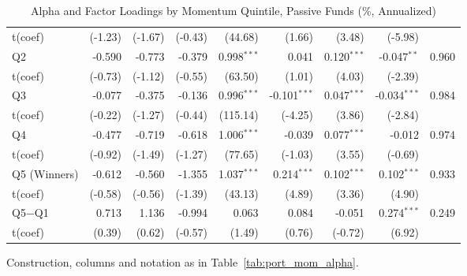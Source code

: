 \begin{table}[!htbp]
{\begin{tabular*}{\linewidth}{@{\extracolsep{\fill}}lrrrrrrrr}
\hspace{1em}t(coef) & (-1.23) & (-1.67) & (-0.43) & (44.68) & (1.66) & (3.48) & (-5.98) & \\
\hspace{1em}Q2 & -0.590 & -0.773 & -0.379 & 0.998$^{***}$ & 0.041 & 0.120$^{***}$ & -0.047$^{**}$ & 0.960\\
\hspace{1em}t(coef) & (-0.73) & (-1.12) & (-0.55) & (63.50) & (1.01) & (4.03) & (-2.39) & \\
\hspace{1em}Q3 & -0.077 & -0.375 & -0.136 & 0.996$^{***}$ & -0.101$^{***}$ & 0.047$^{***}$ & -0.034$^{***}$ & 0.984\\
\hspace{1em}t(coef) & (-0.22) & (-1.27) & (-0.44) & (115.14) & (-4.25) & (3.86) & (-2.84) & \\
\hspace{1em}Q4 & -0.477 & -0.719 & -0.618 & 1.006$^{***}$ & -0.039 & 0.077$^{***}$ & -0.012 & 0.974\\
\hspace{1em}t(coef) & (-0.92) & (-1.49) & (-1.27) & (77.65) & (-1.03) & (3.55) & (-0.69) & \\
\hspace{1em}Q5 (Winners) & -0.612 & -0.560 & -1.355 & 1.037$^{***}$ & 0.214$^{***}$ & 0.102$^{***}$ & 0.102$^{***}$ & 0.933\\
\hspace{1em}t(coef) & (-0.58) & (-0.56) & (-1.39) & (43.13) & (4.89) & (3.36) & (4.90) & \\
\hspace{1em}Q5$-$Q1 & 0.713 & 1.136 & -0.994 & 0.063 & 0.084 & -0.051 & 0.274$^{***}$ & 0.249\\
\hspace{1em}t(coef) & (0.39) & (0.62) & (-0.57) & (1.49) & (0.76) & (-0.72) & (6.92) & \\
\bottomrule
\end{tabular*}%
}\sbefit
\fi
\setlength{\tabletempwidth}{\wd\tabletempbox}
\ifdim\tabletempwidth>\linewidth\setlength{\tabletempwidth}{\linewidth}\fi
\begin{minipage}{\tabletempwidth}
\captionsetup{width=\linewidth}
\caption{Alpha and Factor Loadings by Momentum Quintile, Passive Funds (\%, Annualized)}\label{tab:port_mom_alpha_passive}
\ifdim\wd\tabletempbox>\linewidth
  \resizebox{\linewidth}{!}{\usebox{\tabletempbox}}
\else
  \usebox{\tabletempbox}
\fi
\par\medskip
\begin{singlespace}\tablefont\noindent
Construction, columns and notation as in Table~\ref{tab:port_mom_alpha}.
\end{singlespace}
\end{minipage}
\end{table}

